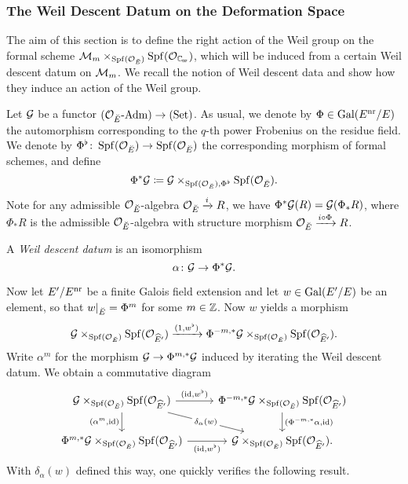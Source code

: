 \documentclass[../main.tex]{subfiles}
\begin{document}

\subsubsection{The Weil Descent Datum on the Deformation Space} %
\label{ssub:The Weil Descent Datum}
The aim of this section is to define the right action of the Weil 
group on the formal scheme 
$\cM_m \times_{\spf(\cO_\br E)} \spf(\cO_\Cp)$, which will be induced
from a certain Weil descent datum on $\mathcal{M}_m$. 
We recall the notion of Weil descent data and show how they induce 
an action of the Weil group.

Let $\mathcal{G}$ be a functor ${({\mathcal{O}_{\breve {E}}}\textnormal-\allowbreak\mathrm{Adm})} \to {(\mathrm{Set})}$. As usual, we denote
by $\Phi \in \operatorname{Gal}(E^{\mathrm{nr}}/E)$ the automorphism corresponding to the
$q$-th power Frobenius on the residue field. We denote
by $\Phi^\flat\colon \operatorname{Spf}(\mathcal{O}_{\breve {E}}) \to \operatorname{Spf}(\mathcal{O}_{\breve {E}})$ the 
corresponding morphism of formal schemes, and define
\begin{equation*}
  \Phi^* \mathcal{G} \coloneqq \mathcal{G} \times_{\operatorname{Spf}(\mathcal{O}_{\breve {E}}), \Phi^\flat}
  \operatorname{Spf}(\mathcal{O}_{\breve {E}}).
\end{equation*}
Note for any admissible $\mathcal{O}_{\breve {E}}$-algebra $\mathcal{O}_{\breve {E}} \xrightarrow{i} R$, we have 
$\Phi^* \mathcal{G}(R) = \mathcal{G}(\Phi_* R)$, where $\Phi_* R$ is the admissible
$\mathcal{O}_{\breve {E}}$-algebra with structure morphism $\mathcal{O}_{\breve {E}} \xrightarrow{i \circ \Phi}
R$. 

\begin{defi}\label{def:WeilDD}
  A \emph{Weil descent datum} is an isomorphism
  \begin{equation*}
    \alpha\colon \mathcal{G} \to \Phi^* \mathcal{G}.
  \end{equation*}
\end{defi}

Now let $E'/E^{\mathrm{nr}}$ be a finite Galois field extension and let 
$w \in \operatorname{Gal}(E'/E)$ be an element, so that $w|_{\breve {E}} = \Phi^m$ for some
$m \in \mathbb{Z}$. Now $w$ yields a morphism
\begin{equation*}
  \mathcal{G} \times_{\operatorname{Spf}(\mathcal{O}_{\breve {E}})} \operatorname{Spf}(\mathcal{O}_{\widehat E'}) \xrightarrow{(1, w^\flat)}
  \Phi^{-m, *} \mathcal{G} \times_{\operatorname{Spf}(\mathcal{O}_{\breve {E}})} \operatorname{Spf}(\mathcal{O}_{\widehat E'}).
\end{equation*}
Write $\alpha^m$ for the morphism $\mathcal{G} \to \Phi^{m,*} \mathcal{G}$ 
induced by iterating the Weil descent datum. We obtain a commutative diagram
\begin{equation*}
\begin{tikzcd}[ampersand replacement=\&]
	{\cG \times_{\spf(\cO_\br E)}\spf(\cO_{\hat E'})} \& {\Phi^{-m,*}\cG \times_{\spf(\cO_\br E)}\spf(\cO_{\hat E'})} \\
	{\Phi^{m,*}\cG \times_{\spf(\cO_\br E)}\spf(\cO_{\hat E'})} \& {\cG \times_{\spf(\cO_\br E)}\spf(\cO_{\hat E'}).}
	\arrow["{(\id, w^\flat)}", from=1-1, to=1-2]
	\arrow["{(\alpha^m, \id)}"', from=1-1, to=2-1]
	\arrow["{\delta_\alpha(w)}"{description}, from=1-1, to=2-2]
	\arrow["{(\Phi^{-m,*}\alpha, \id)}", from=1-2, to=2-2]
	\arrow["{(\id, w^\flat)}"', from=2-1, to=2-2]
\end{tikzcd}
\end{equation*}
With $\delta_\alpha(w)$ defined this way, one quickly verifies the following
result.
\end{document}
